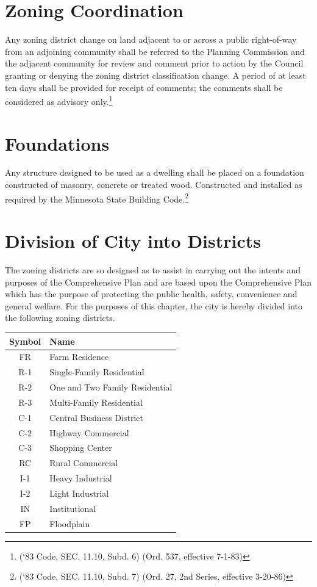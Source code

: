 \section{Zoning Coordination}
Any zoning district change on land adjacent to or across a public right-of-way from an adjoining community shall be referred to the Planning Commission and the adjacent community for review and comment prior to action by the Council granting or denying the zoning district classification change.  A period of at least ten days shall be provided for receipt of comments; the comments shall be considered as advisory only.\footnote{(‘83 Code, SEC. 11.10, Subd. 6)  (Ord. 537, effective 7-1-83)}
\section{Foundations}
Any structure designed to be used as a dwelling shall be placed on a foundation constructed of masonry, concrete or treated wood. Constructed and installed as required by the Minnesota State Building Code.\footnote{(‘83 Code, SEC. 11.10, Subd. 7)  (Ord. 27, 2nd Series, effective 3-20-86)}


\setcounter{section}{19}
\section{Division of City into Districts}
The zoning districts are so designed as to assist in carrying out the intents and purposes of the Comprehensive Plan and are based upon the Comprehensive Plan which has the purpose of protecting the public health, safety, convenience and general welfare. For the purposes of this chapter, the city is hereby divided into the following zoning districts.
\begin{center}
    \begin{tabular}{|c|p{5cm}|}
    \hline
    \textbf{Symbol} & \textbf{Name}\\
    \hline
    FR & Farm Residence\\
    \hline
   R-1 & Single-Family Residential\\
    \hline
   R-2 & One and Two Family Residential\\
    \hline
   R-3 & Multi-Family Residential\\
    \hline
   C-1 & Central Business District\\
    \hline
   C-2 & Highway Commercial\\
    \hline
   C-3 & Shopping Center\\
    \hline
    RC & Rural Commercial\\
    \hline
   I-1 & Heavy Industrial\\
    \hline
   I-2 & Light Industrial\\
    \hline
    IN & Institutional\\
    \hline
    FP & Floodplain\\
    \hline
\end{tabular}
\end{center}
